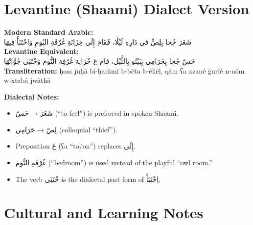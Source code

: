 \documentclass[a4paper,12pt]{article}
\begin{document}
\section{Levantine (Shaami) Dialect Version}

\begin{tcolorbox}[colback=white,colframe=accentcolor]
\textbf{Modern Standard Arabic:}\\
\textarabic{شَعَرَ جُحا بِلِصٍّ في دَارِهِ لَيْلًا، فَقَامَ إِلَى خِزَانَةِ غُرْفَةِ البُومِ وَاخْتَبَأَ فِيهَا}
\\[1em]
\textbf{Levantine Equivalent:}\\
\textarabic{حَسّ جُحا بِحَرَامِي بِبَيْتُو بِاللَّيْل، قام عَ خْزانِة غُرْفِة النُّوم وَخْتَبَى جُوَّاتْهَا}\\[0.5em]
\textbf{Transliteration:} ḥass juḥā bi-ḥarāmī b-bētu b-éllēl, qām ʕa xzané ġurfé n-nōm w-xtabā jwāthā
\end{tcolorbox}

\textbf{Dialectal Notes:}
\begin{itemize}
\item \textarabic{شَعَرَ} → \textarabic{حَسّ} (“to feel”) is preferred in spoken Shaami.
\item \textarabic{لِصّ} → \textarabic{حَرَامِي} (colloquial “thief”).
\item Preposition \textarabic{عَ} (ʕa “to/on”) replaces \textarabic{إِلَى}.
\item \textarabic{غُرْفَةِ النُّوم} (“bedroom”) is used instead of the playful “owl room.”
\item The verb \textarabic{خْتَبَى} is the dialectal past form of \textarabic{اِخْتَبَأَ}.
\end{itemize}

\section{Cultural and Learning Notes}
\end{document}
